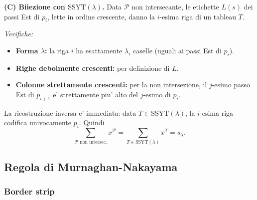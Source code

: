 {  \textbf{(C) Biiezione con $ \mathrm{SSYT}(\lambda) $.}
  Data $ \mathcal{P} $ non intersecante, le etichette $ L(s) $ dei passi Est di $ p_i $,
  lette in ordine crescente, danno la $ i $-esima riga di un tableau $ T $.

  \textit{Verifiche:}
  \begin{itemize}
    \item \textbf{Forma $ \lambda $:} la riga $ i $ ha esattamente $ \lambda_i $ caselle
          (uguali ai passi Est di $ p_i $).
    \item \textbf{Righe debolmente crescenti:} per definizione di $ L $.
    \item \textbf{Colonne strettamente crescenti:} per la non intersezione, il $ j $-esimo
          passo Est di $ p_{i+1} $ e' strettamente piu' alto del $ j $-esimo di $ p_i $.
  \end{itemize}

  La ricostruzione inversa e' immediata: data $ T \in \mathrm{SSYT}(\lambda) $, la
  $ i $-esima riga codifica univocamente $ p_i $. Quindi
  \[
    \sum_{\mathcal{P} \text{ non intersec.}} x^{\mathcal{P}}
    = \sum_{T \in \mathrm{SSYT}(\lambda)} x^T = s_\lambda.
  \]
}

\subsection{Regola di Murnaghan-Nakayama}

\subsubsection{Border strip}




